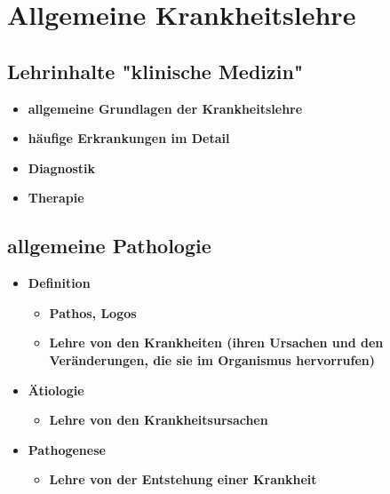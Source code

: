 \section{Allgemeine Krankheitslehre}

\subsection{Lehrinhalte "klinische Medizin"}
	\begin{itemize}
		\item \textbf{allgemeine Grundlagen der Krankheitslehre}
		\item \textbf{häufige Erkrankungen im Detail}
		\item \textbf{Diagnostik}
		\item \textbf{Therapie}
	\end{itemize}

\subsection{allgemeine Pathologie}
	\begin{itemize}
		\item \textbf{Definition}
			\begin{itemize}
				\item \textbf{Pathos, Logos}
				\item \textbf{Lehre von den Krankheiten (ihren Ursachen und den  Veränderungen, die sie im Organismus hervorrufen)}
			\end{itemize}
		\item \textbf{Ätiologie}
			\begin{itemize}
				\item \textbf{Lehre von den Krankheitsursachen}
			\end{itemize}
		\item \textbf{Pathogenese}
			\begin{itemize}
				\item \textbf{Lehre von der Entstehung einer Krankheit}
			\end{itemize}
	\end{itemize}

